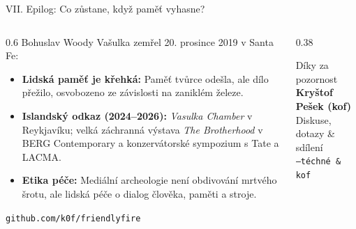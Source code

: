 \documentclass[aspectratio=169,11pt]{beamer}
\begin{document}
\begin{frame}{VII. Epilog: Co zůstane, když paměť vyhasne?}
  \begin{columns}
    \begin{column}{0.6\textwidth}
      Bohuslav Woody Vašulka zemřel 20. prosince 2019 v Santa Fe:
      \begin{itemize}
        \item \textbf{Lidská paměť je křehká:} Paměť tvůrce odešla, ale dílo přežilo, osvobozeno ze závislosti na zaniklém železe.
        \item \textbf{Islandský odkaz (2024--2026):} \textit{Vasulka Chamber} v Reykjavíku; velká záchranná výstava \textit{The Brotherhood} v BERG Contemporary a konzervátorské sympozium s Tate a LACMA.
        \item \textbf{Etika péče:} Mediální archeologie není obdivování mrtvého šrotu, ale lidská péče o dialog člověka, paměti a stroje.
      \end{itemize}
      \vspace{0.3cm}
      \centering\large\texttt{\textcolor{vasulkaamber}{github.com/k0f/friendlyfire}}
    \end{column}
    \begin{column}{0.38\textwidth}
      \begin{block}{Díky za pozornost}
        \centering
        \textbf{Kryštof Pešek (kof)}\\
        \vspace{0.2cm}
        \small Diskuse, dotazy \& sdílení\\
        \vspace{0.4cm}
        \scriptsize\texttt{--téchné \& kof}
      \end{block}
    \end{column}
  \end{columns}
\end{frame}
\end{document}
